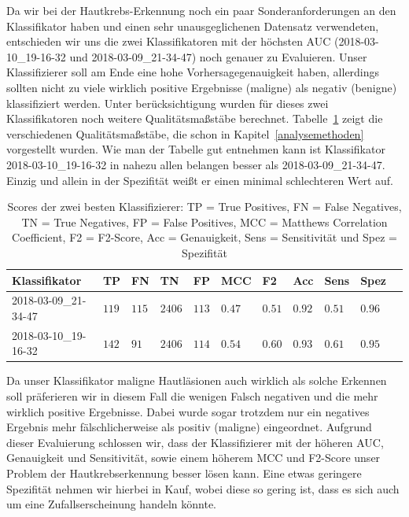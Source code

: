 Da wir bei der Hautkrebs-Erkennung noch ein paar Sonderanforderungen an den Klassifikator haben und einen sehr unausgeglichenen Datensatz verwendeten, entschieden wir uns die zwei Klassifikatoren mit der höchsten AUC (2018-03-10\_19-16-32 und 2018-03-09\_21-34-47) noch genauer zu Evaluieren. Unser Klassifizierer soll am Ende  eine hohe Vorhersagegenauigkeit haben, allerdings sollten nicht zu viele wirklich positive Ergebnisse (maligne) als negativ (benigne) klassifiziert werden. Unter berücksichtigung wurden für dieses zwei Klassifikatoren noch weitere Qualitätsmaßstäbe berechnet. Tabelle~\ref{tab:scores} zeigt die verschiedenen Qualitätsmaßstäbe,  die schon in Kapitel~\ref{analysemethoden} vorgestellt wurden. Wie man der Tabelle gut entnehmen kann ist Klassifikator 2018-03-10\_19-16-32 in nahezu allen belangen besser als 2018-03-09\_21-34-47. Einzig und allein in der Spezifität weißt er einen minimal schlechteren Wert auf.

\begin{table}[htb!]
\begin{center}
\begin{tabular}{lllllllllll}
	\toprule
 	Klassifikator  & TP & FN & TN & FP & MCC & F2 & Acc & Sens & Spez\\
	\midrule
	2018-03-09\_21-34-47 & $119$ &	$115$ &	$2406$ &	$113$ &	$0.47$ &	$0.51$&	$0.92$ &	$0.51$ & $0.96$\\
    2018-03-10\_19-16-32 & $142$&	$91$ &	$2406$ &	$114$ &	$0.54$ 	&$0.60$	&$0.93$	&$0.61$&	$0.95$ \\
 \bottomrule
 \end{tabular}
 \end{center}
  \caption{Scores der zwei besten Klassifizierer: TP = True Positives, FN = False Negatives, TN = True Negatives, FP = False Positives, MCC = Matthews Correlation Coefficient, F2 = F2-Score, Acc = Genauigkeit, Sens = Sensitivität und Spez = Spezifität }
 \label{tab:scores}
 \end{table}
 
 Da unser Klassifikator maligne Hautläsionen auch wirklich als solche Erkennen soll präferieren wir in diesem Fall die wenigen Falsch negativen und die mehr wirklich positive Ergebnisse. Dabei wurde sogar trotzdem nur ein negatives Ergebnis mehr fälschlicherweise als positiv (maligne) eingeordnet. Aufgrund dieser Evaluierung schlossen wir, dass der Klassifizierer mit der höheren AUC, Genauigkeit und Sensitivität, sowie einem  höherem MCC und F2-Score unser Problem der Hautkrebserkennung besser lösen kann. Eine etwas geringere Spezifität nehmen wir hierbei in Kauf, wobei diese so gering ist, dass es sich auch um eine Zufallserscheinung handeln könnte.
 
